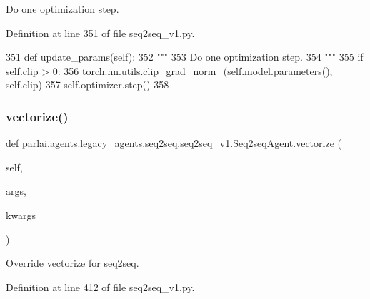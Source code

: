 \begin{DoxyVerb}Do one optimization step.
\end{DoxyVerb}
 

Definition at line 351 of file seq2seq\+\_\+v1.\+py.


\begin{DoxyCode}
351     \textcolor{keyword}{def }update\_params(self):
352         \textcolor{stringliteral}{"""}
353 \textcolor{stringliteral}{        Do one optimization step.}
354 \textcolor{stringliteral}{        """}
355         \textcolor{keywordflow}{if} self.clip > 0:
356             torch.nn.utils.clip\_grad\_norm\_(self.model.parameters(), self.clip)
357         self.optimizer.step()
358 
\end{DoxyCode}
\mbox{\label{classparlai_1_1agents_1_1legacy__agents_1_1seq2seq_1_1seq2seq__v1_1_1Seq2seqAgent_ae0e5663a7879b2704378dfe99ef6d0f4}} 
\subsubsection{\texorpdfstring{vectorize()}{vectorize()}}
{\footnotesize\ttfamily def parlai.\+agents.\+legacy\+\_\+agents.\+seq2seq.\+seq2seq\+\_\+v1.\+Seq2seq\+Agent.\+vectorize (\begin{DoxyParamCaption}\item[{}]{self,  }\item[{}]{args,  }\item[{}]{kwargs }\end{DoxyParamCaption})}

\begin{DoxyVerb}Override vectorize for seq2seq.
\end{DoxyVerb}
 

Definition at line 412 of file seq2seq\+\_\+v1.\+py.


